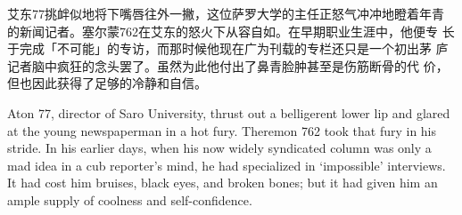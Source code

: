 艾东77挑衅似地将下嘴唇往外一撇，这位萨罗大学的主任正怒气冲冲地瞪着年青
的新闻记者。塞尔蒙762在艾东的怒火下从容自如。在早期职业生涯中，他便专
长于完成「不可能」的专访，而那时候他现在广为刊载的专栏还只是一个初出茅
庐记者脑中疯狂的念头罢了。虽然为此他付出了鼻青脸肿甚至是伤筋断骨的代
价，但也因此获得了足够的冷静和自信。

Aton 77, director of Saro University, thrust out a belligerent lower
lip and glared at the young newspaperman in a hot fury. Theremon 762
took that fury in his stride. In his earlier days, when his now
widely syndicated column was only a mad idea in a cub reporter's
mind, he had specialized in `impossible' interviews. It had cost him
bruises, black eyes, and broken bones; but it had given him an ample
supply of coolness and self-confidence.
